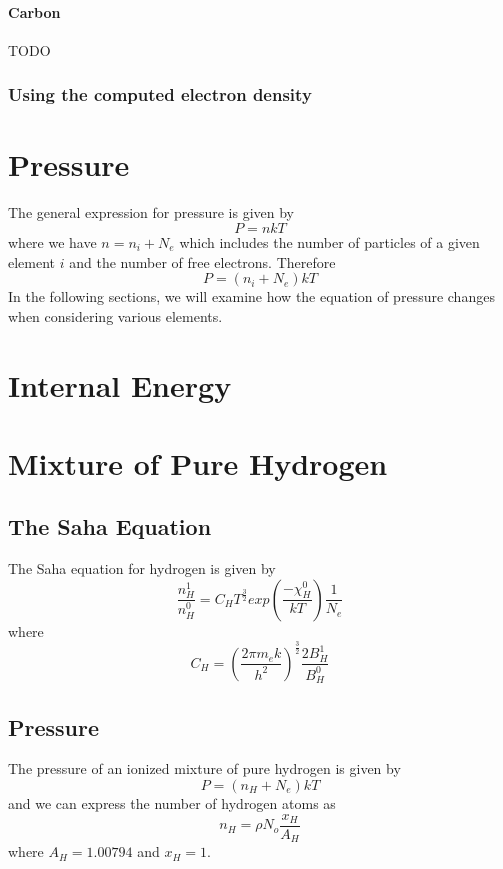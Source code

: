 \documentclass{article}
\begin{document}
				\paragraph{Carbon}
					TODO

			\subsubsection{Using the computed electron density}

						

	\section{Pressure}
		The general expression for pressure is given by
		\begin{equation}
			P = n k T
		\end{equation}
		where we have $n = n_i + N_e$ which includes the number of particles of a 
		given element $i$ and the number of free electrons. Therefore
		\begin{equation}
			P = (n_i + N_e) k T
		\end{equation}
		In the following sections, we will examine how the equation of pressure 
		changes when considering various elements.

	\section{Internal Energy}

	\section{Mixture of Pure Hydrogen}
		\subsection{The Saha Equation}
			The Saha equation for hydrogen is given by
			\begin{equation} \label{eq:h_saha}
				\frac{n^{1}_H}{n^0_H} = C_H T^\frac{3}{2} 
					exp\left(\frac{-\chi^0_H}{kT}\right) \frac{1}{N_e}
			\end{equation}
			where
			\begin{equation*} \label{eq:saha_constant_H}
				C_H = \left( \frac{2 \pi m_e k}{h^2} \right)^\frac{3}{2}  
					\frac{2 B^{1}_H}{B^0_H}
			\end{equation*}


		\subsection{Pressure}
			The pressure of an ionized mixture of pure hydrogen is given by
			\begin{equation}
				P = (n_H + N_e) k T
			\end{equation}
			and we can express the number of hydrogen atoms as
			\begin{equation}
				n_H = \rho N_o \frac{x_H}{A_H} 
			\end{equation}
			where $A_H = 1.00794$ and $x_H = 1$.
\end{document}
